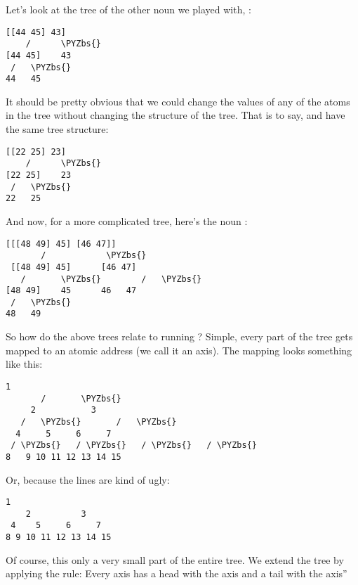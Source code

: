Let's look at the tree of the other noun we played with, \kode{[[44 45] 43]}:
\begin{framed_shaded}
\begin{Verbatim}[fontsize=\relsize{-2.5},fontseries=b,commandchars=\\\{\}]
 [[44 45] 43]
    /      \PYZbs{}
[44 45]    43
 /   \PYZbs{}
44   45
\end{Verbatim}
\end{framed_shaded}
It should be pretty obvious that we could change the values of any of the atoms
in the tree without changing the structure of the tree. That is to say, \kode{[[44
45] 43]} and \kode{[[24 25] 23]} have the same tree structure:
\begin{framed_shaded}
\begin{Verbatim}[fontsize=\relsize{-2.5},fontseries=b,commandchars=\\\{\}]
 [[22 25] 23]
    /      \PYZbs{}
[22 25]    23
 /   \PYZbs{}
22   25
\end{Verbatim}
\end{framed_shaded}
And now, for a more complicated tree, here's the noun \kode{[[[48 49] 45] [46 47]]}:
\begin{framed_shaded}
\begin{Verbatim}[fontsize=\relsize{-2.5},fontseries=b,commandchars=\\\{\}]
  [[[48 49] 45] [46 47]]
       /            \PYZbs{}
 [[48 49] 45]      [46 47]
   /       \PYZbs{}        /   \PYZbs{}
[48 49]    45      46   47
 /   \PYZbs{}
48   49
\end{Verbatim}
\end{framed_shaded}
So how do the above trees relate to running ? Simple, every part
of the tree gets mapped to an atomic address (we call it an axis). The mapping
looks something like this:
\begin{framed_shaded}
\begin{Verbatim}[fontsize=\relsize{-2.5},fontseries=b,commandchars=\\\{\}]
           1 
       /       \PYZbs{}
     2           3          
   /   \PYZbs{}       /   \PYZbs{}
  4     5     6     7     
 / \PYZbs{}   / \PYZbs{}   / \PYZbs{}   / \PYZbs{}
8   9 10 11 12 13 14 15
\end{Verbatim}
\end{framed_shaded}
Or, because the lines are kind of ugly:
\begin{framed_shaded}
\begin{Verbatim}[fontsize=\relsize{-2.5},fontseries=b,commandchars=\\\{\}]
         1
    2          3
 4    5     6     7
8 9 10 11 12 13 14 15
\end{Verbatim}
\end{framed_shaded}
Of course, this only a very small part of the entire tree. We extend the tree
by applying the rule: Every axis  has a head with the axis and a tail
with the axis''

